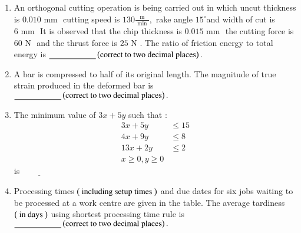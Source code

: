 \documentclass[journal]{IEEEtran}
\begin{document}
\begin{enumerate} [start=40]
\bigskip
\item An orthogonal cutting operation is being carried out in which uncut thickness is $0.010\text{ mm }$ cutting speed is $130\frac{\text{ m }}{\text{ min }},$ rake angle $15^{\circ}$and width of cut is $6\text{ mm }$  It is observed that
the chip thickness is $0.015\text{ mm }$ the cutting force is $60\text{ N }$ and the thrust force is $25\text{ N }.$  The ratio of friction energy to total energy is $\underline{\hspace{2cm}} \left(\text{correct to two decimal places}\right).$ 
\bigskip
\item A bar is compressed to half of its original length. The magnitude of true strain produced in the deformed bar is $\underline{\hspace{2cm}} \left(\text{correct to two decimal places}\right).$
\bigskip
\item The minimum value of $3x+5y$ such that :
\begin{align*}
3x + 5y &\leq 15 \\
4x + 9y &\leq 8 \\
13x + 2y &\leq 2 \\
x \geq 0, y \geq 0
\end{align*}
is$\underline{\hspace{2cm}}$
\bigskip
\item Processing times $\left(\text{ including setup times }\right)$  and due dates for six jobs waiting to be processed at a work centre are given in the table. The average tardiness $\left(\text{ in days }\right)$ using shortest processing time rule is $\underline{\hspace{2cm}} \left(\text{correct to two decimal places}\right).$ 
\begin{figure}[H]
\centering
{}
\end{figure}
\end{enumerate}
\end{document}
